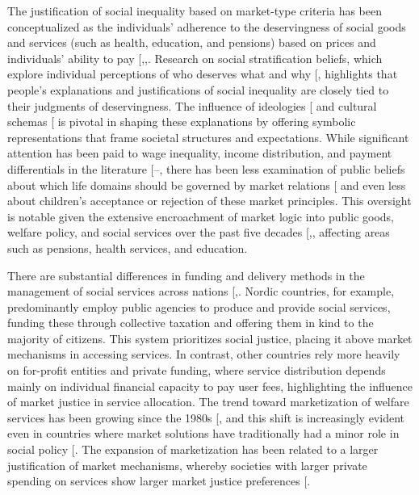 \documentclass[
  12pt,
  letterpaper,
]{article}
\begin{document}
The justification of social inequality based on market-type criteria has
been conceptualized as the individuals' adherence to the deservingness
of social goods and services (such as health, education, and pensions)
based on prices and individuals' ability to pay
{[},,\citeproc{ref-streeck_citizens_2012}{20}{]}.
Research on social stratification beliefs, which explore individual
perceptions of who deserves what and why
{[}\citeproc{ref-kluegel_beliefs_1987}{21}{]}, highlights that people's
explanations and justifications of social inequality are closely tied to
their judgments of deservingness. The influence of ideologies
{[}\citeproc{ref-wegener_dominant_1995}{22}{]} and cultural schemas
{[}\citeproc{ref-homan_being_2017}{23}{]} is pivotal in shaping these
explanations by offering symbolic representations that frame societal
structures and expectations. While significant attention has been paid
to wage inequality, income distribution, and payment differentials in
the literature
{[}--\citeproc{ref-shariff_income_2016}{27}{]},
there has been less examination of public beliefs about which life
domains should be governed by market relations
{[}\citeproc{ref-lindh_bringing_2023}{10}{]} and even less about
children's acceptance or rejection of these market principles. This
oversight is notable given the extensive encroachment of market logic
into public goods, welfare policy, and social services over the past
five decades
{[},\citeproc{ref-harvey_breve_2015}{29}{]},
affecting areas such as pensions, health services, and education.

There are substantial differences in funding and delivery methods in the
management of social services across nations
{[},\citeproc{ref-stoy_worlds_2014}{31}{]}.
Nordic countries, for example, predominantly employ public agencies to
produce and provide social services, funding these through collective
taxation and offering them in kind to the majority of citizens. This
system prioritizes social justice, placing it above market mechanisms in
accessing services. In contrast, other countries rely more heavily on
for-profit entities and private funding, where service distribution
depends mainly on individual financial capacity to pay user fees,
highlighting the influence of market justice in service allocation. The
trend toward marketization of welfare services has been growing since
the 1980s {[}\citeproc{ref-salamon_marketization_1993}{32}{]}, and this
shift is increasingly evident even in countries where market solutions
have traditionally had a minor role in social policy
{[}\citeproc{ref-sivesind_changing_2017}{33}{]}. The expansion of
marketization has been related to a larger justification of market
mechanisms, whereby societies with larger private spending on services
show larger market justice preferences
{[}\citeproc{ref-lindh_public_2015}{34}{]}.
\end{document}
